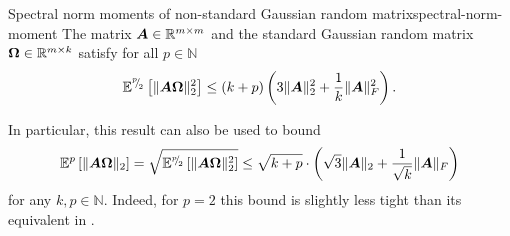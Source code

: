\documentclass[12pt]{article}
\begin{document}
\begin{lemma}{Spectral norm moments of non-standard Gaussian random matrix}{spectral-norm-moment}
    The matrix $\boldsymbol{A} \in \mathbb{R}^{m \times m}$ and the standard Gaussian random matrix $\boldsymbol{\Omega} \in \mathbb{R}^{m \times k}$ satisfy for all $p \in \mathbb{N}$ 
    \begin{equation}
        \mathbb{E}^{{}^{p}{\mskip -5mu/\mskip -3mu}_{2}}\left[ \lVert \boldsymbol{A} \boldsymbol{\Omega} \rVert _2^2 \right]
        \leq  (k + p) \left( 3 \lVert \boldsymbol{A} \rVert _2^2 + \frac{1}{k} \lVert \boldsymbol{A} \rVert _F^2 \right).
    \end{equation}
\end{lemma}

\begin{remark}
    In particular, this result can also be used to bound
    \begin{equation}
        \mathbb{E}^{p}\left[ \lVert \boldsymbol{A} \boldsymbol{\Omega} \rVert _2 \right] = \sqrt{\mathbb{E}^{{}^{p}{\mskip -5mu/\mskip -3mu}_{2}}\left[ \lVert \boldsymbol{A} \boldsymbol{\Omega} \rVert _2^2 \right]} \leq \sqrt{k + p} \cdot \left(\sqrt{3} \lVert \boldsymbol{A} \rVert _2 + \frac{1}{\sqrt{k}}\lVert \boldsymbol{A} \rVert _F\right)
    \end{equation}
    for any $k,p \in \mathbb{N}$. Indeed, for $p=2$ this bound is slightly less tight than its equivalent in \cite[lemma B.1]{tropp-2023-randomized-algorithms}.
\end{remark}
\end{document}
